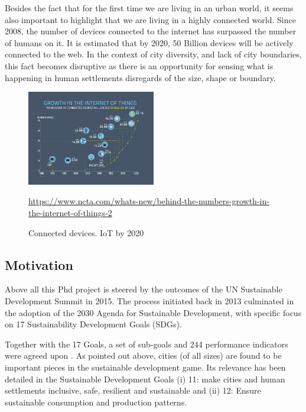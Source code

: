 Besides the fact that for the first time we are living in an urban world, it seems also important to highlight that we are living in a highly connected world. Since 2008, the number of devices connected to the internet has surpassed the number of humans on it. It is estimated that by 2020, 50 Billion devices will be actively connected to the web. In the context of city diversity, and lack of city boundaries, this fact becomes disruptive as there is an opportunity for sensing what is happening in human settlements disregards of the size, shape or boundary.\par


\begin{figure}[ht!]
    \centering
    \includegraphics[width=0.5\textwidth]{Imgs/3_iot.png}
    \caption{Connected devices. IoT by 2020}
    \label{fig:iot}
    \url{https://www.ncta.com/whats-new/behind-the-numbers-growth-in-the-internet-of-things-2}
\end{figure}

\subsection{Motivation}
Above all this Phd project is steered by the outcomes of the UN Sustainable Development Summit in 2015. The process initiated back in 2013 culminated in the adoption of the 2030 Agenda for Sustainable Development, with specific focus on 17 Sustainability Development Goals (SDGs). \par

Together with the 17 Goals, a set of sub-goals and 244 performance indicators were agreed upon \cite{UN2017}. As pointed out above, cities (of all sizes) are found to be important pieces in the sustainable development game. Its relevance has been detailed in the Sustainable Development Goals (i) 11: make cities and human settlements inclusive, safe, resilient and sustainable and (ii) 12: Ensure sustainable consumption and production patterns. \par

